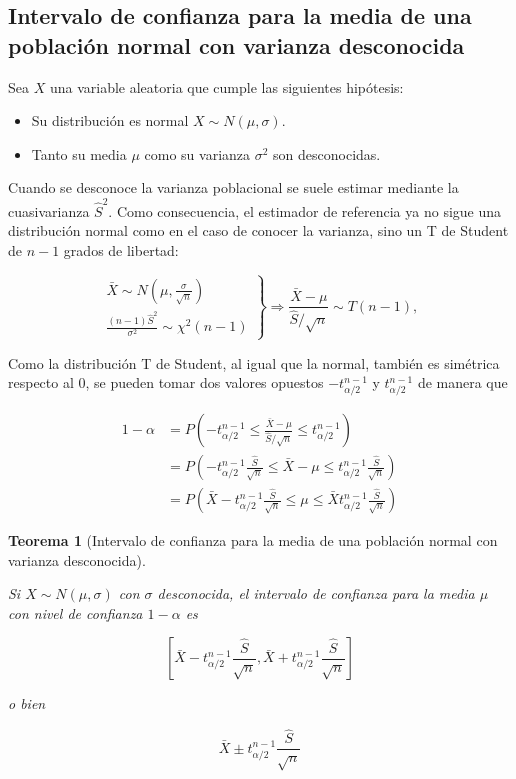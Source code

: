 \documentclass[
  spanish,
  a4paper,
]{scrreport}
\providecommand{\tightlist}{%
  \setlength{\itemsep}{0pt}\setlength{\parskip}{0pt}}
\theoremstyle{plain}
\newtheorem{theorem}{Teorema}[chapter]
\theoremstyle{definition}
\theoremstyle{definition}
\theoremstyle{remark}
\begin{document}
\subsection{Intervalo de confianza para la media de una población normal
con varianza
desconocida}\label{intervalo-de-confianza-para-la-media-de-una-poblaciuxf3n-normal-con-varianza-desconocida}

Sea \(X\) una variable aleatoria que cumple las siguientes hipótesis:

\begin{itemize}
\tightlist
\item
  Su distribución es normal \(X\sim N(\mu,\sigma)\).
\item
  Tanto su media \(\mu\) como su varianza \(\sigma^2\) son desconocidas.
\end{itemize}

Cuando se desconoce la varianza poblacional se suele estimar mediante la
cuasivarianza \(\hat{S}^2\). Como consecuencia, el estimador de
referencia ya no sigue una distribución normal como en el caso de
conocer la varianza, sino un T de Student de \(n-1\) grados de libertad:

\[
\left.
\begin{array}{l}
\bar X \sim N\left(\mu,\frac{\sigma}{\sqrt{n}}\right)\\
\displaystyle\frac{(n-1)\hat{S}^2}{\sigma^2}\sim \chi^2(n-1)
\end{array}
\right\}
\Rightarrow
\frac{\bar X -\mu}{\hat{S}/\sqrt{n}}\sim T(n-1),
\]

Como la distribución T de Student, al igual que la normal, también es
simétrica respecto al 0, se pueden tomar dos valores opuestos
\(-t^{n-1}_{\alpha/2}\) y \(t^{n-1}_{\alpha/2}\) de manera que

\begin{align*}
1-\alpha 
&= P\left(-t^{n-1}_{\alpha/2}\leq \frac{\bar X -\mu}{\hat{S}/\sqrt{n}} \leq t^{n-1}_{\alpha/2}\right)\\
&= P\left(-t^{n-1}_{\alpha/2}\frac{\hat{S}}{\sqrt{n}}\leq \bar X -\mu \leq t^{n-1}_{\alpha/2}\frac{\hat{S}}{\sqrt{n}}\right)\\
&= P\left(\bar X-t^{n-1}_{\alpha/2}\frac{\hat{S}}{\sqrt{n}}\leq \mu \leq \bar X t^{n-1}_{\alpha/2}\frac{\hat{S}}{\sqrt{n}}\right)
\end{align*}

\begin{theorem}[Intervalo de confianza para la media de una población
normal con varianza
desconocida]\protect\hypertarget{thm-intervalo-confianza-media-normal-varianza-desconocida}{}\label{thm-intervalo-confianza-media-normal-varianza-desconocida}

Si \(X\sim N(\mu, \sigma)\) con \(\sigma\) desconocida, el
\emph{intervalo de confianza para la media} \(\mu\) con nivel de
confianza \(1-\alpha\) es

\[
\left[\bar{X}-t^{n-1}_{\alpha/2}\frac{\hat{S}}{\sqrt{n}},\bar{X}+t^{n-1}_{\alpha/2}\frac{\hat{S}}{\sqrt{n}}\right]
\]

o bien

\[
\bar{X}\pm t^{n-1}_{\alpha/2}\frac{\hat{S}}{\sqrt{n}}
\]

\end{theorem}
\end{document}
